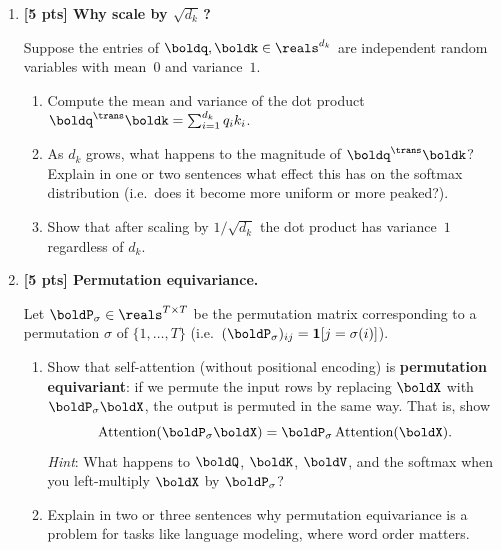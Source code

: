\documentclass[submit]{../harvardml}
\begin{document}
\begin{problem}
\begin{enumerate}
\begin{enumerate}
  \item Compute the scaled score matrix $\boldS / \sqrt{d_k}$.
  Then apply softmax row-wise to obtain the attention weight matrix
  $\boldA \in \reals^{2 \times 2}$.

  You may leave your answer in terms of $e^{(\cdot)}$ and sums, or compute
  decimal approximations.
\end{enumerate}
\item \textbf{[5 pts] Why scale by $\sqrt{d_k}$\,?}

Suppose the entries of $\boldq, \boldk \in \reals^{d_k}$ are independent random
variables with mean~$0$ and variance~$1$.

\begin{enumerate}
  \item Compute the mean and variance of the dot product
  $\boldq^\trans \boldk = \sum_{i=1}^{d_k} q_i k_i$.

  \item As $d_k$ grows, what happens to the magnitude of $\boldq^\trans \boldk$?
  Explain in one or two sentences what effect this has on the softmax distribution
  (i.e.\ does it become more uniform or more peaked?).

  \item Show that after scaling by $1/\sqrt{d_k}$ the dot product has variance~$1$
  regardless of $d_k$.
\end{enumerate}

\item \textbf{[5 pts] Permutation equivariance.}

Let $\boldP_\sigma \in \reals^{T \times T}$ be the permutation matrix corresponding
to a permutation $\sigma$ of $\{1, \dots, T\}$ (i.e.\ $(\boldP_\sigma)_{ij} =
\mathbf{1}[j = \sigma(i)]$).

\begin{enumerate}
  \item Show that self-attention (without positional encoding) is
  \textbf{permutation equivariant}: if we permute the input rows by replacing
  $\boldX$ with $\boldP_\sigma \boldX$, the output is permuted in the same way.
  That is, show
  \[
    \text{Attention}(\boldP_\sigma \boldX) = \boldP_\sigma \, \text{Attention}(\boldX).
  \]
  \textit{Hint}: What happens to $\boldQ$, $\boldK$, $\boldV$, and the softmax
  when you left-multiply $\boldX$ by $\boldP_\sigma$?

  \item Explain in two or three sentences why permutation equivariance is a
  problem for tasks like language modeling, where word order matters.


\end{enumerate}
\end{enumerate}
\end{problem}
\end{document}
